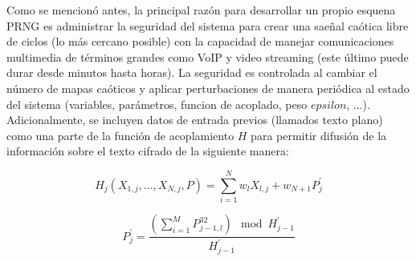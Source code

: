 \documentclass[10pt]{IEEEtran}
\begin{document}
Como se mencionó antes, la principal razón para desarrollar un propio esquena PRNG es administrar la seguridad del sistema para crear una saeñal caótica libre de ciclos (lo más cercano posible) con la capacidad de manejar comunicaciones multimedia de términos grandes como VoIP y video streaming (este último puede durar desde minutos hasta horas). La seguridad es controlada al cambiar el número de mapas caóticos y aplicar perturbaciones de manera periódica al estado del sistema (variables, parámetros, funcion de acoplado, peso $epsilon$, ...). Adicionalmente, se incluyen datos de entrada previos (llamados texto plano) como una parte de la función de acoplamiento $H$ para permitir difusión de la información sobre el texto cifrado de la siguiente manera:

\begin{equation}
H_{j}(X_{1,j}, ... ,X_{N,j},P)= \sum_{i=1}^{N}w_{l}X_{l,j}+ w_{N+1}P_{j}^{'}
\end{equation} 

\begin{equation}
P^{'}_{j}= \frac{ \left( \sum_{i=1}^{M} P^{32}_{j-1,l}  \right) \mod{H_{j-1}^{'}} }{ H_{j-1}^{'}}
\end{equation} 
 
\end{document}
